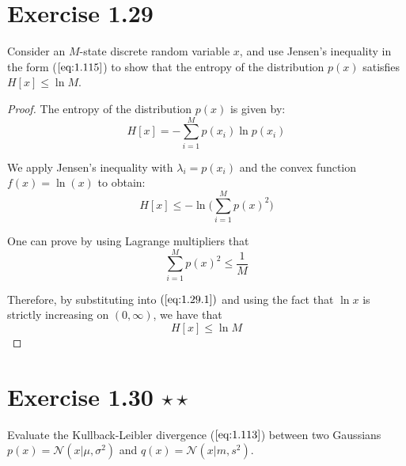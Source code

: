 \vspace{1em}

\section*{Exercise 1.29}
Consider an $M$-state  discrete random variable $x$, and use Jensen's inequality
in the form ($\ref{eq:1.115}$) to show that the entropy of the distribution
$p(x)$ satisfies $H[x] \leq \ln M$.

\vspace{1em}

\begin{proof}
    The entropy of the distribution $p(x)$ is given by:
    \[
        H[x] = - \sum_{i=1}^{M} p(x_i) \ln p(x_i) 
    \] 

    We apply Jensen's inequality with $\lambda_i = p(x_i)$ and the convex
    function $f(x) = \ln(x)$ to obtain:
    \begin{equation*}
        H[x] \leq -\ln\bigg(\sum_{i=1}^{M} p(x)^2\bigg)
        \tag{1.29.1}\label{eq:1.29.1}
    \end{equation*}

    One can prove by using Lagrange multipliers that
    \[
        \sum_{i=1}^{M} p(x)^2 \leq \frac{1}{M}
    \] 

    Therefore, by substituting into $(\ref{eq:1.29.1})$ and using 
    the fact that $\ln x$ is strictly increasing on $(0, \infty)$,
    we have that
    \[
        H[x] \leq \ln M
    \] 
\end{proof}

\section*{Exercise 1.30 $\star \star$}
Evaluate the Kullback-Leibler divergence ($\ref{eq:1.113}$) between two Gaussians
$p(x) = \mathcal{N}(x | \mu, \sigma^2)$ and $q(x) = \mathcal{N}(x | m, s^2)$.

\vspace{1em}

